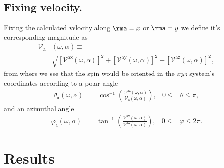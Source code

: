 \documentclass[prb,11pt,tightenlines,twocolumn,aps]{revtex4-1}
\begin{document}
\subsection{Fixing velocity.}\label{sec:theory-fixvel}

Fixing the calculated velocity along $\rma=x$ or $\rma=y$
 we define it's corresponding magnitude as
\begin{align}
\mathcal{V}_{\mathrm{a}}&(\omega,\alpha) \equiv \nonumber \\
&\sqrt { 
[\mathcal{V}^{\mathrm{ax}}(\omega,\alpha)]^{2} +
[\mathcal{V}^{\mathrm{ay}}(\omega,\alpha)]^{2} +
[\mathcal{V}^{\mathrm{az}}(\omega,\alpha)]^{2} 
},
\label{eq:vv-mag}
\end{align}
from where we see that the spin would be oriented
in the $xyz$ system's coordinates
according to a polar angle
\begin{align}
\theta_{\mathrm{a}}  (\omega,\alpha)
=& 
\cos^{-1} \left( \frac{\mathcal{V}^{\mathrm{az}}(\omega,\alpha)}
{\mathcal{V}_{\mathrm{a}}(\omega,\alpha)} \right),
& 0 \leq &\theta \leq \pi, 
\label{eq:polar-ang}
\end{align}
and an azimuthal angle
\begin{align}
\varphi_{\mathrm{a}} (\omega,\alpha)
=& 
\tan^{-1} \left( \frac{\mathcal{V}^{\mathrm{ay}}(\omega,\alpha)}
{\mathcal{V}^{\mathrm{ax}}(\omega,\alpha)} \right),
& 0 \leq &\varphi \leq 2\pi.
\label{eq:azimuthal-ang} 
\end{align} 



\section{Results} %
\label{sec:results}
\end{document}
